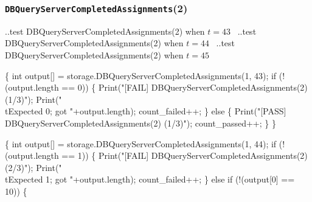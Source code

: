 \documentclass{article}
\def\nwendcode{\endtrivlist \endgroup}
\let\nwdocspar=\par
\begin{document}
\subsubsection{{\tt{}DBQueryServerCompletedAssignments}(2)}
\nwenddocs{}\endmoddef{}
  \LA{}..test \code{}DBQueryServerCompletedAssignments\edoc{}(2) when $t=43$~{\nwtagstyle{}}\RA{}
  \LA{}..test \code{}DBQueryServerCompletedAssignments\edoc{}(2) when $t=44$~{\nwtagstyle{}}\RA{}
  \LA{}..test \code{}DBQueryServerCompletedAssignments\edoc{}(2) when $t=45$~{\nwtagstyle{}}\RA{}
\nwendcode{}\nwdocspar
\nwenddocs{}\endmoddef{}
\{
  int output[] = storage.DBQueryServerCompletedAssignments(1, 43);
  if (!(output.length == 0)) \{
    Print("[FAIL] DBQueryServerCompletedAssignments(2) (1/3)");
    Print("\\tExpected 0; got "+output.length);
    count_failed++;
  \} else \{
    Print("[PASS] DBQueryServerCompletedAssignments(2) (1/3)");
    count_passed++;
  \}
\}
\nwendcode{}\nwdocspar
\nwenddocs{}\endmoddef{}
\{
  int output[] = storage.DBQueryServerCompletedAssignments(1, 44);
  if (!(output.length == 1)) \{
    Print("[FAIL] DBQueryServerCompletedAssignments(2) (2/3)");
    Print("\\tExpected 1; got "+output.length);
    count_failed++;
  \} else if (!(output[0] == 10)) \{
\end{document}
